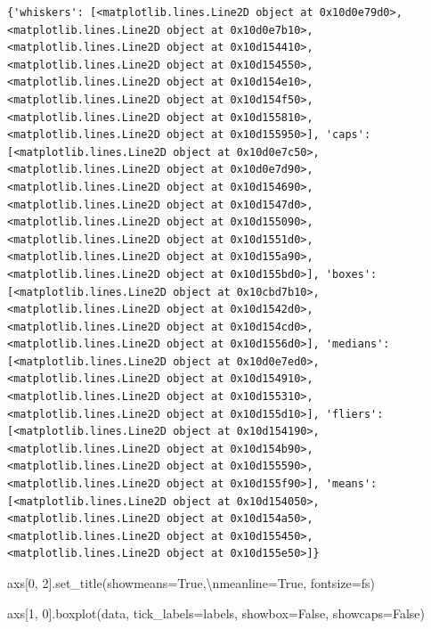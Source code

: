 \documentclass[
  letterpaper,
  DIV=11,
  numbers=noendperiod]{scrreprt}
\newenvironment{Shaded}{\begin{snugshade}}{\end{snugshade}}
\newcommand{\CharTok}[1]{\textcolor[rgb]{0.13,0.47,0.30}{#1}}
\newcommand{\DecValTok}[1]{\textcolor[rgb]{0.68,0.00,0.00}{#1}}
\newcommand{\NormalTok}[1]{\textcolor[rgb]{0.00,0.23,0.31}{#1}}
\newcommand{\OperatorTok}[1]{\textcolor[rgb]{0.37,0.37,0.37}{#1}}
\newcommand{\StringTok}[1]{\textcolor[rgb]{0.13,0.47,0.30}{#1}}
\newcommand{\VariableTok}[1]{\textcolor[rgb]{0.07,0.07,0.07}{#1}}
\begin{document}
\begin{verbatim}
{'whiskers': [<matplotlib.lines.Line2D object at 0x10d0e79d0>, <matplotlib.lines.Line2D object at 0x10d0e7b10>, <matplotlib.lines.Line2D object at 0x10d154410>, <matplotlib.lines.Line2D object at 0x10d154550>, <matplotlib.lines.Line2D object at 0x10d154e10>, <matplotlib.lines.Line2D object at 0x10d154f50>, <matplotlib.lines.Line2D object at 0x10d155810>, <matplotlib.lines.Line2D object at 0x10d155950>], 'caps': [<matplotlib.lines.Line2D object at 0x10d0e7c50>, <matplotlib.lines.Line2D object at 0x10d0e7d90>, <matplotlib.lines.Line2D object at 0x10d154690>, <matplotlib.lines.Line2D object at 0x10d1547d0>, <matplotlib.lines.Line2D object at 0x10d155090>, <matplotlib.lines.Line2D object at 0x10d1551d0>, <matplotlib.lines.Line2D object at 0x10d155a90>, <matplotlib.lines.Line2D object at 0x10d155bd0>], 'boxes': [<matplotlib.lines.Line2D object at 0x10cbd7b10>, <matplotlib.lines.Line2D object at 0x10d1542d0>, <matplotlib.lines.Line2D object at 0x10d154cd0>, <matplotlib.lines.Line2D object at 0x10d1556d0>], 'medians': [<matplotlib.lines.Line2D object at 0x10d0e7ed0>, <matplotlib.lines.Line2D object at 0x10d154910>, <matplotlib.lines.Line2D object at 0x10d155310>, <matplotlib.lines.Line2D object at 0x10d155d10>], 'fliers': [<matplotlib.lines.Line2D object at 0x10d154190>, <matplotlib.lines.Line2D object at 0x10d154b90>, <matplotlib.lines.Line2D object at 0x10d155590>, <matplotlib.lines.Line2D object at 0x10d155f90>], 'means': [<matplotlib.lines.Line2D object at 0x10d154050>, <matplotlib.lines.Line2D object at 0x10d154a50>, <matplotlib.lines.Line2D object at 0x10d155450>, <matplotlib.lines.Line2D object at 0x10d155e50>]}
\end{verbatim}

\begin{Shaded}
\begin{Highlighting}[]
\NormalTok{axs[}\DecValTok{0}\NormalTok{, }\DecValTok{2}\NormalTok{].set\_title(}\StringTok{\textquotesingle{}showmeans=True,}\CharTok{\textbackslash{}n}\StringTok{meanline=True\textquotesingle{}}\NormalTok{, fontsize}\OperatorTok{=}\NormalTok{fs)}

\NormalTok{axs[}\DecValTok{1}\NormalTok{, }\DecValTok{0}\NormalTok{].boxplot(data, tick\_labels}\OperatorTok{=}\NormalTok{labels, showbox}\OperatorTok{=}\VariableTok{False}\NormalTok{, showcaps}\OperatorTok{=}\VariableTok{False}\NormalTok{)}
\end{Highlighting}
\end{Shaded}
\end{document}
